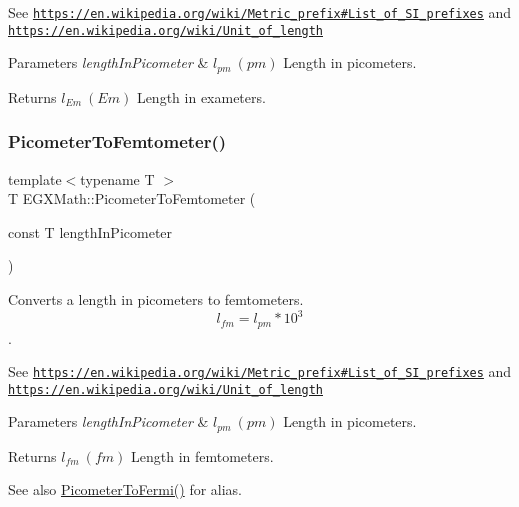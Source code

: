 See \href{https://en.wikipedia.org/wiki/Metric_prefix#List_of_SI_prefixes}{\tt https\+://en.\+wikipedia.\+org/wiki/\+Metric\+\_\+prefix\#\+List\+\_\+of\+\_\+\+S\+I\+\_\+prefixes} and \href{https://en.wikipedia.org/wiki/Unit_of_length}{\tt https\+://en.\+wikipedia.\+org/wiki/\+Unit\+\_\+of\+\_\+length} 
\begin{DoxyParams}{Parameters}
{\em length\+In\+Picometer} & $ l_{pm}\ (pm)$ Length in picometers. \\
\hline
\end{DoxyParams}
\begin{DoxyReturn}{Returns}
$ l_{Em}\ (Em)$ Length in exameters. 
\end{DoxyReturn}
\mbox{\label{group___e_g_x_math-_conversions-_length_conversions-_s_i-_picometer-_s_i_gabdc7e9ceb6baa9da4cee4b791084fb2a}} 
\subsubsection{\texorpdfstring{Picometer\+To\+Femtometer()}{PicometerToFemtometer()}}
{\footnotesize\ttfamily template$<$typename T $>$ \\
T E\+G\+X\+Math\+::\+Picometer\+To\+Femtometer (\begin{DoxyParamCaption}\item[{const T}]{length\+In\+Picometer }\end{DoxyParamCaption})}



Converts a length in picometers to femtometers. \[ l_{fm}=l_{pm} * 10^{3} \]. 

See \href{https://en.wikipedia.org/wiki/Metric_prefix#List_of_SI_prefixes}{\tt https\+://en.\+wikipedia.\+org/wiki/\+Metric\+\_\+prefix\#\+List\+\_\+of\+\_\+\+S\+I\+\_\+prefixes} and \href{https://en.wikipedia.org/wiki/Unit_of_length}{\tt https\+://en.\+wikipedia.\+org/wiki/\+Unit\+\_\+of\+\_\+length} 
\begin{DoxyParams}{Parameters}
{\em length\+In\+Picometer} & $ l_{pm}\ (pm)$ Length in picometers. \\
\hline
\end{DoxyParams}
\begin{DoxyReturn}{Returns}
$ l_{fm}\ (fm)$ Length in femtometers. 
\end{DoxyReturn}
\begin{DoxySeeAlso}{See also}
\mbox{\hyperlink{group___e_g_x_math-_conversions-_length_conversions-_s_i-_picometer-_non-_s_i_ga13ec47b0b50eca30313bb7902a28f0c9}{Picometer\+To\+Fermi()}} for alias. 
\end{DoxySeeAlso}
\mbox{\label{group___e_g_x_math-_conversions-_length_conversions-_s_i-_picometer-_s_i_ga9dbf38a2c9eb2f88b4e5061861ec42de}} 
